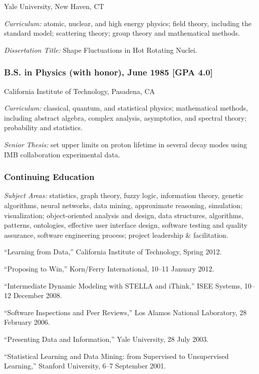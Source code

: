 \documentclass[]{article}
\begin{document}
Yale University, New Haven, CT

\emph{Curriculum:} atomic, nuclear, and high energy physics; field
theory, including the standard model; scattering theory; group theory
and mathematical methods.

\emph{Dissertation Title:} Shape Fluctuations in Hot Rotating Nuclei.

\subsubsection{B.S. in Physics (with honor), June 1985 {[}GPA
4.0{]}}\label{b.s.-in-physics-with-honor-june-1985-gpa-4.0}

California Institute of Technology, Pasadena, CA

\emph{Curriculum:} classical, quantum, and statistical physics;
mathematical methods, including abstract algebra, complex analysis,
asymptotics, and spectral theory; probability and statistics.

\emph{Senior Thesis:} set upper limits on proton lifetime in several
decay modes using IMB collaboration experimental data.

\subsubsection{Continuing Education}\label{continuing-education}

\emph{Subject Areas:} statistics, graph theory, fuzzy logic, information
theory, genetic algorithms, neural networks, data mining, approximate
reasoning, simulation; visualization; object-oriented analysis and
design, data structures, algorithms, patterns, ontologies, effective
user interface design, software testing and quality assurance, software
engineering process; project leadership \& facilitation.

``Learning from Data,'' California Institute of Technology, Spring 2012.

``Proposing to Win,'' Korn/Ferry International, 10--11 January 2012.

``Intermediate Dynamic Modeling with STELLA and iThink,'' ISEE Systems,
10--12 December 2008.

``Software Inspections and Peer Reviews,'' Los Alamos National
Laboratory, 28 February 2006.

``Presenting Data and Information,'' Yale University, 28 July 2003.

``Statistical Learning and Data Mining: from Supervised to Unsupervised
Learning,'' Stanford University, 6--7 September 2001.
\end{document}
